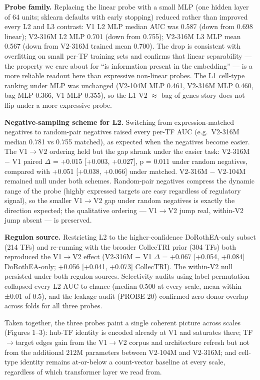 \documentclass[
  11pt,
]{article}
\begin{document}
\textbf{Probe family.} Replacing the linear probe with a small MLP (one
hidden layer of 64 units; sklearn defaults with early stopping) reduced rather than improved every
L2 and L3 contrast: V1 L2 MLP median AUC was 0.587 (down from 0.698
linear); V2-316M L2 MLP 0.701 (down from 0.755); V2-316M L3 MLP mean 0.567
(down from V2-316M trained mean 0.700). The drop is consistent with overfitting on small
per-TF training sets and confirms that linear separability --- the
property we care about for ``is information present in the embedding''
--- is a more reliable readout here than expressive non-linear probes.
The L1 cell-type ranking under MLP was unchanged (V2-104M MLP 0.461,
V2-316M MLP 0.460, bag MLP 0.366, V1 MLP 0.355), so the L1 V2 $\approx$
bag-of-genes story does not flip under a more expressive probe.

\textbf{Negative-sampling scheme for L2.} Switching from expression-matched
negatives to random-pair negatives raised every per-TF AUC (e.g.~V2-316M
median 0.781 vs 0.755 matched), as expected when the negatives become
easier. The V1$\to$V2 ordering held but the gap shrank under the easier
task: V2-316M $-$ V1 paired $\Delta$ = +0.015 {[}+0.003, +0.027{]}, p = 0.011 under random
negatives, compared with +0.051 {[}+0.038, +0.066{]} under matched. V2-316M $-$
V2-104M remained null under both schemes. Random-pair negatives compress the dynamic range of the probe (highly expressed targets are easy regardless of regulatory signal), so the smaller V1$\to$V2 gap under random negatives is exactly the direction expected; the qualitative ordering --- V1$\to$V2 jump real, within-V2 jump absent --- is preserved.

\textbf{Regulon source.} Restricting L2 to the higher-confidence
DoRothEA-only subset (214 TFs) and re-running with the broader CollecTRI
prior (304 TFs) both reproduced the V1$\to$V2 effect (V2-316M $-$ V1 $\Delta$ =
+0.067 {[}+0.054, +0.084{]} DoRothEA-only; +0.056 {[}+0.041, +0.073{]}
CollecTRI). The within-V2 null persisted under both regulon sources.
Selectivity audits using label permutation collapsed every L2 AUC to
chance (median 0.500 at every scale, mean within ±0.01 of 0.5), and the
leakage audit (PROBE-20) confirmed zero donor overlap across folds for
all three probes.

Taken together, the three probes paint a single coherent picture across
scales (Figures 1--3): hub-TF identity is encoded already at V1 and
saturates there; TF$\to$target edges gain from the V1$\to$V2 corpus and
architecture refresh but not from the additional 212M parameters between
V2-104M and V2-316M; and cell-type identity remains at-or-below a
count-vector baseline at every scale, regardless of which transformer
layer we read from.
\end{document}
